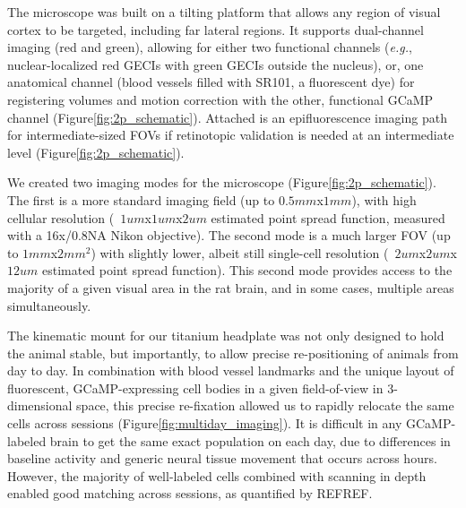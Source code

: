 The microscope was built on a tilting platform that allows any region of visual cortex to be targeted, including far lateral regions. It supports dual-channel imaging (red and green), allowing for either two functional channels (\textit{e.g.}, nuclear-localized red GECIs with green GECIs outside the nucleus), or, one anatomical channel (blood vessels filled with SR101, a fluorescent dye) for registering volumes and motion correction with the other, functional GCaMP channel (Figure\ref{fig:2p_schematic}). Attached is an epifluorescence imaging path for intermediate-sized FOVs if retinotopic validation is needed at an intermediate level (Figure\ref{fig:2p_schematic}). 

We created two imaging modes for the microscope (Figure\ref{fig:2p_schematic}). The first is a more standard imaging field (up to $0.5mm$x$1mm$), with high cellular resolution (~$1um$x$1um$x$2um$ estimated point spread function, measured with a 16x/0.8NA Nikon objective). The second mode is a much larger FOV (up to $1mm$x$2mm^2$) with slightly lower, albeit still single-cell resolution (~$2um$x$2um$x$12um$ estimated point spread function). This second mode provides access to the majority of a given visual area in the rat brain, and in some cases, multiple areas simultaneously. 

The kinematic mount for our titanium headplate was not only designed to hold the animal stable, but importantly, to allow precise re-positioning of animals from day to day. In combination with blood vessel landmarks and the unique layout of fluorescent, GCaMP-expressing cell bodies in a given field-of-view in 3-dimensional space, this precise re-fixation allowed us to rapidly relocate the same cells across sessions (Figure\ref{fig:multiday_imaging}). It is difficult in any GCaMP-labeled brain to get the same exact population on each day, due to differences in baseline activity and generic neural tissue movement that occurs across hours. However, the majority of well-labeled cells combined with scanning in depth enabled good matching across sessions, as quantified by REFREF. 

